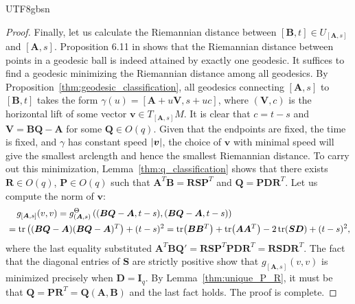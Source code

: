 \documentclass[12pt]{report}
\newcommand\tab[1][1cm]{\hspace*{#1}}
\newcommand{\bracket}[1]{\left ( #1 \right )}
\theoremstyle{plain}
\theoremstyle{definition}
\begin{document}
\begin{CJK*}{UTF8}{gbsn}
\begin{proof}
Finally, let us calculate the Riemannian distance 
between $[\bm{B},t] \in U_{[\bm{A},s]}$ and $[\bm{A},s]$.
Proposition 6.11 in \cite{Lee_2018} shows that
the Riemannian distance between points in a geodesic ball is indeed attained 
by exactly one geodesic.
It suffices to find a geodesic minimizing the Riemannian distance 
among all geodesics.
By Proposition~\ref{thm:geodesic_classification},
all geodesics connecting $[\bm{A},s]$ to $[\bm{B},t]$
takes the form $\gamma(u)=[\bm{A}+u\bm{V},s+uc]$,
where $(\bm{V},c)$ is the horizontal lift of some 
vector $\bm{v} \in T_{[\bm{A},s]}M$.
It is clear that $c = t-s$ and $\bm{V} = \bm{B}\bm{Q}-\bm{A}$
for some $\bm{Q} \in O(q)$.
Given that the endpoints are fixed,
the time is fixed,
and $\gamma$ has constant speed $\abs{\bm{v}}$,
the choice of $\bm{v}$ with minimal speed 
will give the smallest arclength and hence the smallest Riemannian distance.
To carry out this minimization,
Lemma~\ref{thm:q_classification} shows that
there exists $\bm{R} \in O(q)$, $\bm{P} \in O(q)$
such that
$\bm{A}^T\bm{B} = \bm{R}\bm{S}\bm{P}^T$
and $\bm{Q} = \bm{P}\bm{D}\bm{R}^T$.
Let us compute the norm of $\bm{v}$:
\begin{align*}
  & \tab[0.4cm] g_{[\bm{A},s]}(v, v)
  = g_{(\bm{A},s)}^{\Theta}\bracket{(\bm{B}\bm{Q}-\bm{A}, t-s), (\bm{B}\bm{Q}-\bm{A}, t-s)} \\
  &= \tr\bracket{(\bm{B}\bm{Q}-\bm{A})(\bm{B}\bm{Q}-\bm{A})^T} + (t-s)^2 
  = \tr(\bm{B}\bm{B}^T) + \tr(\bm{A}\bm{A}^T) - 2\tr(\bm{S}\bm{D}) + (t-s)^2,
\end{align*}
where the last equality substituted
$\bm{A}^T\bm{B}\bm{Q}' = \bm{R}\bm{S}\bm{P}^T\bm{P}\bm{D}\bm{R}^T = \bm{R}\bm{S}\bm{D}\bm{R}^T$.
The fact that
the diagonal entries of $\bm{S}$ are strictly positive
show that
$g_{[\bm{A},s]}(v, v)$ is minimized precisely when $\bm{D} = \bm{I}_q$.
By Lemma~\ref{thm:unique_P_R},
it must be that $\bm{Q} = \bm{P}\bm{R}^T = \bm{Q}(\bm{A}, \bm{B})$
and the last fact holds.
The proof is complete.
\end{proof}


\end{CJK*}
\end{document}
